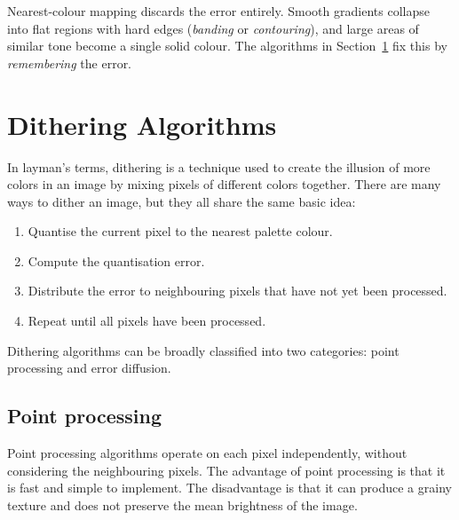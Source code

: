 \documentclass[10pt,a4paper]{article}
\begin{document}
Nearest-colour mapping discards the error entirely.
Smooth gradients collapse into flat regions with hard edges (\emph{banding} or \emph{contouring}),
and large areas of similar tone become a single solid colour.
The algorithms in Section~\ref{sec:algorithms} fix this by \emph{remembering} the error.

\newpage

\section{Dithering Algorithms}
\label{sec:algorithms}
In layman's terms, dithering is a technique used to create the illusion of more colors
in an image by mixing pixels of different colors together.
There are many ways to dither an image, but they all share the same basic idea:
\begin{enumerate}
  \item Quantise the current pixel to the nearest palette colour.
  \item Compute the quantisation error.
  \item Distribute the error to neighbouring pixels that have not yet been processed.
  \item Repeat until all pixels have been processed.
\end{enumerate}
Dithering algorithms can be broadly classified into two categories:
point processing and error diffusion.

\subsection{Point processing}
Point processing algorithms operate on each pixel independently,
without considering the neighbouring pixels.
The advantage of point processing is that it is fast and simple to implement.
The disadvantage is that it can produce a grainy texture
and does not preserve the mean brightness of the image.
\end{document}
